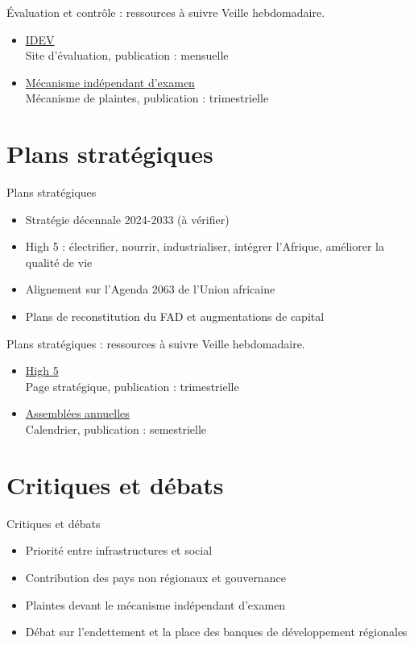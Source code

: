 \documentclass[aspectratio=169,11pt]{beamer}
\begin{document}
\begin{frame}{Évaluation et contrôle : ressources à suivre}
\small
Veille hebdomadaire.
\begin{itemize}
\item \href{https://idev.afdb.org}{IDEV}\\{\footnotesize Site d'évaluation, publication : mensuelle}
\item \href{https://www.afdb.org/en/independent-review-mechanism}{Mécanisme indépendant d'examen}\\{\footnotesize Mécanisme de plaintes, publication : trimestrielle}
\end{itemize}
\end{frame}

\section{Plans stratégiques}
\begin{frame}{Plans stratégiques}
\begin{itemize}
\item Stratégie décennale 2024-2033 (à vérifier)
\item High 5 : électrifier, nourrir, industrialiser, intégrer l'Afrique, améliorer la qualité de vie
\item Alignement sur l'Agenda 2063 de l'Union africaine
\item Plans de reconstitution du FAD et augmentations de capital
\end{itemize}
\end{frame}

\begin{frame}{Plans stratégiques : ressources à suivre}
\small
Veille hebdomadaire.
\begin{itemize}
\item \href{https://www.afdb.org/en/the-high-5}{High 5}\\{\footnotesize Page stratégique, publication : trimestrielle}
\item \href{https://www.afdb.org/en/annual-meetings}{Assemblées annuelles}\\{\footnotesize Calendrier, publication : semestrielle}
\end{itemize}
\end{frame}

\section{Critiques et débats}
\begin{frame}{Critiques et débats}
\begin{itemize}
\item Priorité entre infrastructures et social
\item Contribution des pays non régionaux et gouvernance
\item Plaintes devant le mécanisme indépendant d'examen
\item Débat sur l'endettement et la place des banques de développement régionales
\end{itemize}
\end{frame}
\end{document}
